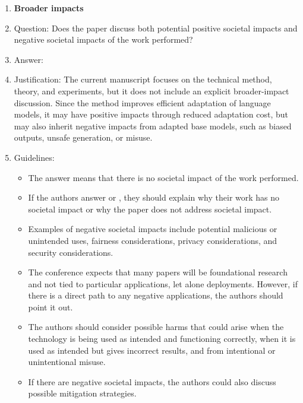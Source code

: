 \begin{enumerate}
\item {\bf Broader impacts}
    \item[] Question: Does the paper discuss both potential positive societal impacts and negative societal impacts of the work performed?
    \item[] Answer: \answerNo{}
    \item[] Justification: The current manuscript focuses on the technical method, theory, and experiments, but it does not include an explicit broader-impact discussion. Since the method improves efficient adaptation of language models, it may have positive impacts through reduced adaptation cost, but may also inherit negative impacts from adapted base models, such as biased outputs, unsafe generation, or misuse.
    \item[] Guidelines:
    \begin{itemize}
        \item The answer \answerNA{} means that there is no societal impact of the work performed.
        \item If the authors answer \answerNA{} or \answerNo{}, they should explain why their work has no societal impact or why the paper does not address societal impact.
        \item Examples of negative societal impacts include potential malicious or unintended uses, fairness considerations, privacy considerations, and security considerations.
        \item The conference expects that many papers will be foundational research and not tied to particular applications, let alone deployments. However, if there is a direct path to any negative applications, the authors should point it out.
        \item The authors should consider possible harms that could arise when the technology is being used as intended and functioning correctly, when it is used as intended but gives incorrect results, and from intentional or unintentional misuse.
        \item If there are negative societal impacts, the authors could also discuss possible mitigation strategies.
    \end{itemize}
    

\end{enumerate}
